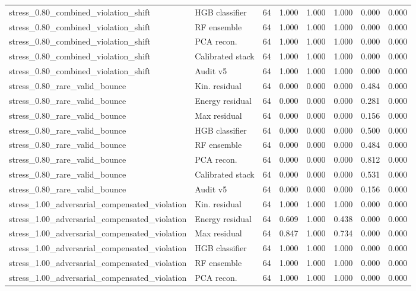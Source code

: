 {\begin{longtable}{llrrrrrr}
stress\_0.80\_combined\_violation\_shift & HGB classifier & 64 & 1.000 & 1.000 & 1.000 & 0.000 & 0.000 \\
stress\_0.80\_combined\_violation\_shift & RF ensemble & 64 & 1.000 & 1.000 & 1.000 & 0.000 & 0.000 \\
stress\_0.80\_combined\_violation\_shift & PCA recon. & 64 & 1.000 & 1.000 & 1.000 & 0.000 & 0.000 \\
stress\_0.80\_combined\_violation\_shift & Calibrated stack & 64 & 1.000 & 1.000 & 1.000 & 0.000 & 0.000 \\
stress\_0.80\_combined\_violation\_shift & Audit v5 & 64 & 1.000 & 1.000 & 1.000 & 0.000 & 0.000 \\
stress\_0.80\_rare\_valid\_bounce & Kin. residual & 64 & 0.000 & 0.000 & 0.000 & 0.484 & 0.000 \\
stress\_0.80\_rare\_valid\_bounce & Energy residual & 64 & 0.000 & 0.000 & 0.000 & 0.281 & 0.000 \\
stress\_0.80\_rare\_valid\_bounce & Max residual & 64 & 0.000 & 0.000 & 0.000 & 0.156 & 0.000 \\
stress\_0.80\_rare\_valid\_bounce & HGB classifier & 64 & 0.000 & 0.000 & 0.000 & 0.500 & 0.000 \\
stress\_0.80\_rare\_valid\_bounce & RF ensemble & 64 & 0.000 & 0.000 & 0.000 & 0.484 & 0.000 \\
stress\_0.80\_rare\_valid\_bounce & PCA recon. & 64 & 0.000 & 0.000 & 0.000 & 0.812 & 0.000 \\
stress\_0.80\_rare\_valid\_bounce & Calibrated stack & 64 & 0.000 & 0.000 & 0.000 & 0.531 & 0.000 \\
stress\_0.80\_rare\_valid\_bounce & Audit v5 & 64 & 0.000 & 0.000 & 0.000 & 0.156 & 0.000 \\
stress\_1.00\_adversarial\_compensated\_violation & Kin. residual & 64 & 1.000 & 1.000 & 1.000 & 0.000 & 0.000 \\
stress\_1.00\_adversarial\_compensated\_violation & Energy residual & 64 & 0.609 & 1.000 & 0.438 & 0.000 & 0.000 \\
stress\_1.00\_adversarial\_compensated\_violation & Max residual & 64 & 0.847 & 1.000 & 0.734 & 0.000 & 0.000 \\
stress\_1.00\_adversarial\_compensated\_violation & HGB classifier & 64 & 1.000 & 1.000 & 1.000 & 0.000 & 0.000 \\
stress\_1.00\_adversarial\_compensated\_violation & RF ensemble & 64 & 1.000 & 1.000 & 1.000 & 0.000 & 0.000 \\
stress\_1.00\_adversarial\_compensated\_violation & PCA recon. & 64 & 1.000 & 1.000 & 1.000 & 0.000 & 0.000 \\

\end{longtable}}
